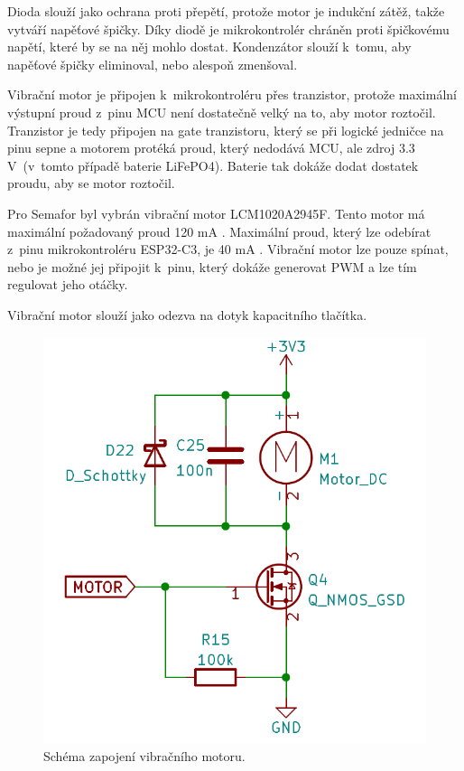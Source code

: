 Dioda slouží jako ochrana proti přepětí, protože motor je indukční zátěž, takže vytváří napěťové špičky. Díky diodě je mikrokontrolér chráněn 
proti špičkovému napětí, které by se na něj mohlo dostat. Kondenzátor slouží k~tomu, aby napěťové špičky eliminoval, nebo alespoň zmenšoval. 

Vibrační motor je připojen k~mikrokontroléru přes tranzistor, protože maximální výstupní proud z~pinu MCU není dostatečně velký na to, aby 
motor roztočil. Tranzistor je tedy připojen na gate tranzistoru, který se při logické jedničce na pinu sepne a motorem protéká proud, který 
nedodává MCU, ale zdroj 3.3 V~(v~tomto případě baterie LiFePO4). Baterie tak dokáže dodat dostatek proudu, aby se motor roztočil. 

Pro Semafor byl vybrán vibrační motor LCM1020A2945F. Tento motor má maximální požadovaný proud 120 mA \cite{vib_motor_dtsh}. Maximální proud, 
který lze odebírat z~pinu mikrokontroléru ESP32-C3, je 40 mA \cite{ESP_C3_dtsh}. Vibrační motor lze pouze spínat, nebo je možné jej připojit 
k~pinu, který dokáže generovat PWM a lze tím regulovat jeho otáčky. 

Vibrační motor slouží jako odezva na dotyk kapacitního tlačítka. 

\begin{figure}[!h]
  \begin{center}
    \includegraphics[scale=0.4]{obrazky/Vibracni_motor.png}
  \end{center}
  \caption[Schéma zapojení vibračního motoru]{Schéma zapojení vibračního motoru.}
\end{figure}

